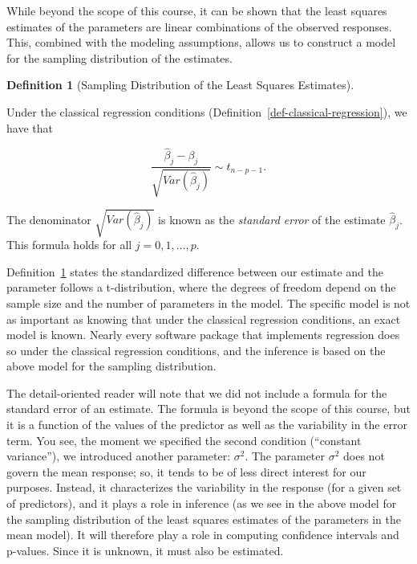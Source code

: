 \documentclass[
  letterpaper,
  DIV=11,
  numbers=noendperiod]{scrreprt}
\theoremstyle{definition}
\theoremstyle{definition}
\newtheorem{definition}{Definition}[chapter]
\theoremstyle{remark}
\begin{document}
\begin{tcolorbox}[enhanced jigsaw, bottomrule=.15mm, titlerule=0mm, bottomtitle=1mm, colback=white, coltitle=black, rightrule=.15mm, leftrule=.75mm, toprule=.15mm, toptitle=1mm, left=2mm, opacityback=0, colframe=quarto-callout-note-color-frame, breakable, title=\textcolor{quarto-callout-note-color}{\faInfo}\hspace{0.5em}{Note}, arc=.35mm, colbacktitle=quarto-callout-note-color!10!white, opacitybacktitle=0.6]

While beyond the scope of this course, it can be shown that the least
squares estimates of the parameters are linear combinations of the
observed responses. This, combined with the modeling assumptions, allows
us to construct a model for the sampling distribution of the estimates.

\end{tcolorbox}

\begin{definition}[Sampling Distribution of the Least Squares
Estimates]\protect\hypertarget{def-ls-sampling-distribution}{}\label{def-ls-sampling-distribution}

Under the classical regression conditions
(Definition~\ref{def-classical-regression}), we have that

\[\frac{\widehat{\beta}_j - \beta_j}{\sqrt{Var\left(\widehat{\beta}_j\right)}} \sim t_{n - p - 1}.\]

The denominator \(\sqrt{Var\left(\widehat{\beta}_j\right)}\) is known as
the \emph{standard error} of the estimate \(\widehat{\beta}_j\). This
formula holds for all \(j = 0, 1, \dotsc, p\).

\end{definition}

Definition~\ref{def-ls-sampling-distribution} states the standardized
difference between our estimate and the parameter follows a
t-distribution, where the degrees of freedom depend on the sample size
and the number of parameters in the model. The specific model is not as
important as knowing that under the classical regression conditions, an
exact model is known. Nearly every software package that implements
regression does so under the classical regression conditions, and the
inference is based on the above model for the sampling distribution.

The detail-oriented reader will note that we did not include a formula
for the standard error of an estimate. The formula is beyond the scope
of this course, but it is a function of the values of the predictor as
well as the variability in the error term. You see, the moment we
specified the second condition (``constant variance''), we introduced
another parameter: \(\sigma^2\). The parameter \(\sigma^2\) does not
govern the mean response; so, it tends to be of less direct interest for
our purposes. Instead, it characterizes the variability in the response
(for a given set of predictors), and it plays a role in inference (as we
see in the above model for the sampling distribution of the least
squares estimates of the parameters in the mean model). It will
therefore play a role in computing confidence intervals and p-values.
Since it is unknown, it must also be estimated.
\end{document}
